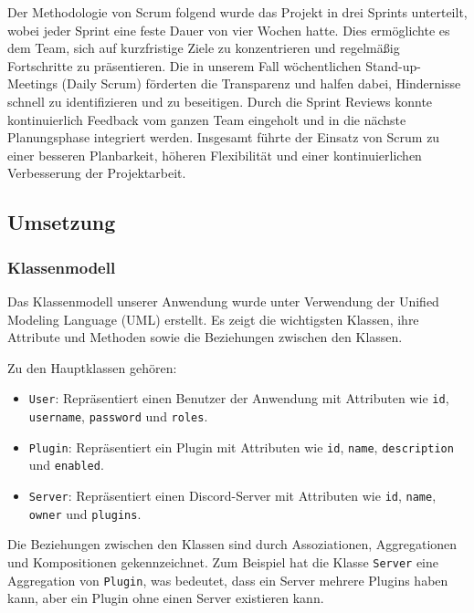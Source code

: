 Der Methodologie von Scrum folgend wurde das Projekt in drei Sprints unterteilt, wobei jeder Sprint eine feste Dauer von vier Wochen hatte. Dies ermöglichte es dem Team, sich auf kurzfristige Ziele zu konzentrieren und regelmäßig Fortschritte zu präsentieren. Die in unserem Fall wöchentlichen Stand-up-Meetings (Daily Scrum) förderten die Transparenz und halfen dabei, Hindernisse schnell zu identifizieren und zu beseitigen. Durch die Sprint Reviews konnte kontinuierlich Feedback vom ganzen Team eingeholt und in die nächste Planungsphase integriert werden. Insgesamt führte der Einsatz von Scrum zu einer besseren Planbarkeit, höheren Flexibilität und einer kontinuierlichen Verbesserung der Projektarbeit.

\subsection{Umsetzung}\label{umsetzung}

\subsubsection{Klassenmodell}\label{klassenmodell}

Das Klassenmodell unserer Anwendung wurde unter Verwendung der Unified
Modeling Language (UML) erstellt. Es zeigt die wichtigsten Klassen, ihre
Attribute und Methoden sowie die Beziehungen zwischen den Klassen.

Zu den Hauptklassen gehören:

\begin{itemize}
\item
  \texttt{User}: Repräsentiert einen Benutzer der Anwendung mit
  Attributen wie \texttt{id}, \texttt{username}, \texttt{password} und
  \texttt{roles}.
\item
  \texttt{Plugin}: Repräsentiert ein Plugin mit Attributen wie
  \texttt{id}, \texttt{name}, \texttt{description} und \texttt{enabled}.
\item
  \texttt{Server}: Repräsentiert einen Discord-Server mit Attributen wie
  \texttt{id}, \texttt{name}, \texttt{owner} und \texttt{plugins}.
\end{itemize}

Die Beziehungen zwischen den Klassen sind durch Assoziationen,
Aggregationen und Kompositionen gekennzeichnet. Zum Beispiel hat die
Klasse \texttt{Server} eine Aggregation von \texttt{Plugin}, was
bedeutet, dass ein Server mehrere Plugins haben kann, aber ein Plugin
ohne einen Server existieren kann.

